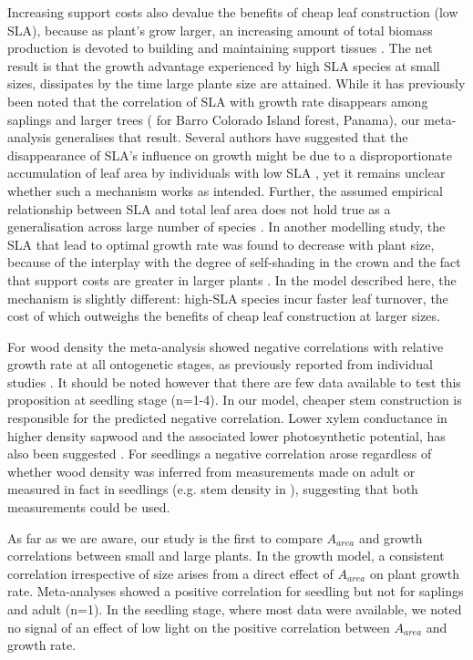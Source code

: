\documentclass[a4paper,11pt]{article}
\begin{document}
Increasing support costs also devalue the benefits of cheap leaf construction (low SLA), because as plant's grow larger, an increasing amount of total biomass production is devoted to building and maintaining support tissues \citep{Givnish:1995ta,King-2011}. The net result is that the growth advantage experienced by high SLA species at small sizes, dissipates by the time large plante size are attained. While it has previously been noted that the correlation of SLA with growth rate disappears among saplings and larger trees (\citealt{Wright:2010tp} for Barro Colorado Island forest, Panama), our meta-analysis generalises that result. Several authors have suggested that the disappearance of SLA's influence on growth might be due to a disproportionate accumulation of leaf area by individuals with low SLA \citep{Reich:1992wm, Poorter:2008iu,Wright:2010tp}, yet it remains unclear whether such a mechanism works as intended. Further, the assumed empirical relationship between SLA and total leaf area does not hold true as a generalisation across large number of species \citep{Duursma-2015}. In another modelling study, the SLA that lead to optimal growth rate was found to decrease with plant size, because of the interplay with the degree of self-shading in the crown and the fact that support costs are greater in larger plants \citep{King-1999}. In the model described here, the mechanism is slightly different: high-SLA species incur faster leaf turnover, the cost of which outweighs the benefits of cheap leaf construction at larger sizes.

For wood density the meta-analysis showed negative correlations with relative growth rate at all ontogenetic stages, as previously reported from individual studies \citep{Wright:2010tp,Ruger:2012jv}. It should be noted however that there are few data available to test this proposition at seedling stage (n=1-4). In our model, cheaper stem construction is responsible for the predicted negative correlation. Lower xylem conductance in higher density sapwood and the associated lower photosynthetic potential, has also been suggested \citep[reviewed by][]{Chave:2009iy}.
For seedlings a negative correlation arose regardless of whether wood density was inferred from measurements made on adult or measured in fact in seedlings (e.g. stem density in  \citealt{CastroDiez:1998gz}), suggesting that both measurements could be used.

As far as we are aware, our study is the first to compare $A_{area}$ and growth correlations between small and large plants. In the growth model, a consistent correlation irrespective of size arises from a direct effect of $A_{area}$ on plant growth rate. Meta-analyses showed a positive correlation for seedling but not for saplings and adult (n=1). In the seedling stage, where most data were available, we noted no signal of an effect of low light on the positive correlation between $A_{area}$ and growth rate.
\end{document}
